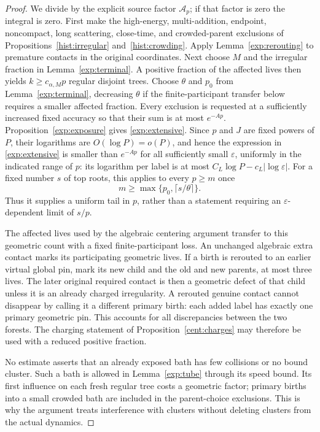\begin{proof}
We divide by the explicit source factor $\mathcal A_p$; if that factor
is zero the integral is zero.  First make the high-energy, multi-addition, endpoint, noncompact, long
scattering, close-time, and crowded-parent exclusions of
Propositions~\ref{hist:irregular} and~\ref{hist:crowding}.  Apply Lemma~\ref{exp:rerouting} to premature contacts in the original
coordinates.  Next choose $M$
and the irregular fraction in Lemma~\ref{exp:terminal}.  A positive fraction of the
affected lives then yields $k\ge c_{\alpha,M}p$ regular disjoint trees.
Choose $\theta$ and $p_0$ from Lemma~\ref{exp:terminal}, decreasing $\theta$
if the finite-participant transfer below requires a smaller affected
fraction.  Every exclusion is requested at a sufficiently increased fixed
accuracy so that their sum is at most $e^{-Ap}$.
Proposition~\ref{exp:exposure} gives \eqref{exp:extensive}.  Since
$p$ and $J$ are fixed powers of $P$, their logarithms are $O(\log P)=o(P)$,
and hence the expression in
\eqref{exp:extensive} is smaller than $e^{-Ap}$ for all sufficiently small
$\varepsilon$, uniformly in the indicated range of $p$: its logarithm
per label is at most $C_L\log P-c_L|\log\varepsilon|$.
For a fixed number $s$ of top roots, this applies to every
$p\ge m$ once
\[
 m\ge\max\{p_0,\lceil s/\theta\rceil\}.
\]
Thus it supplies a uniform tail in $p$, rather than a statement requiring
an $\varepsilon$-dependent limit of $s/p$.

The affected lives used by the algebraic centering argument transfer to this
geometric count with a fixed finite-participant loss.  An unchanged
algebraic extra contact marks its participating geometric lives.  If a
birth is rerouted to an earlier virtual global pin, mark its new child and
the old and new parents, at most three lives.  The later original required
contact is then a geometric defect of that child unless it is an already
charged irregularity.  A rerouted genuine contact cannot disappear by
calling it a different primary birth: each added label has exactly one
primary geometric pin.  This accounts for all discrepancies between the
two forests.  The charging statement of Proposition~\ref{cent:charges} may
therefore be used with a reduced positive fraction.

No estimate asserts that an already exposed bath has few collisions or no
bound cluster.  Such a bath is allowed in Lemma~\ref{exp:tube} through its
speed bound.  Its first influence on each fresh regular tree costs a
geometric factor; primary births into a small crowded bath are included in
the parent-choice exclusions.  This is why the argument treats interference
with clusters without deleting clusters from the actual dynamics.
\end{proof}

